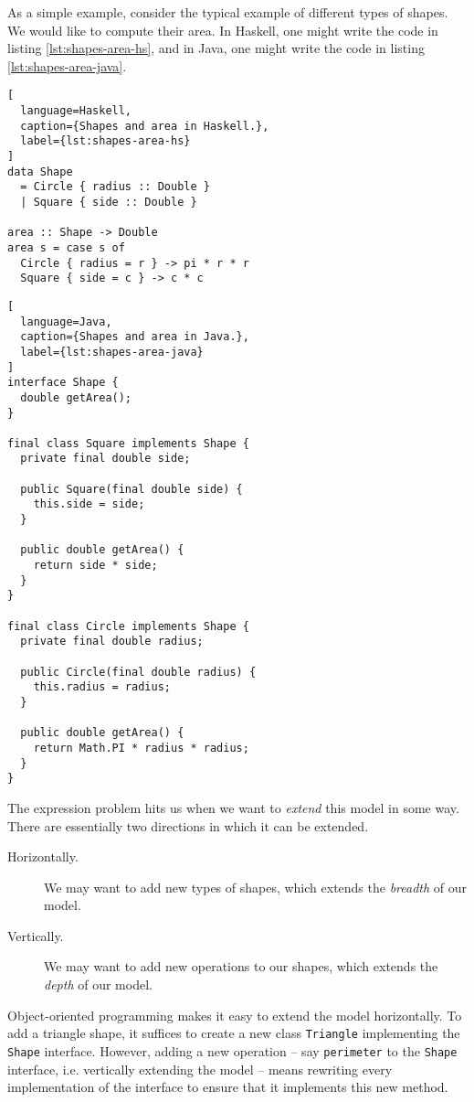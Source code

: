 \documentclass[letterpaper,11pt]{article}
\newcommand{\code}{\texttt}
\begin{document}
As a simple example, consider the typical example of different types of shapes.
We would like to compute their area. In Haskell, one might write the code in
listing \ref{lst:shapes-area-hs}, and in Java, one might write the code in
listing \ref{lst:shapes-area-java}.

\begin{lstlisting}[
  language=Haskell,
  caption={Shapes and area in Haskell.},
  label={lst:shapes-area-hs}
]
data Shape
  = Circle { radius :: Double }
  | Square { side :: Double }

area :: Shape -> Double
area s = case s of
  Circle { radius = r } -> pi * r * r
  Square { side = c } -> c * c
\end{lstlisting}

\begin{lstlisting}[
  language=Java,
  caption={Shapes and area in Java.},
  label={lst:shapes-area-java}
]
interface Shape {
  double getArea();
}

final class Square implements Shape {
  private final double side;

  public Square(final double side) {
    this.side = side;
  }

  public double getArea() {
    return side * side;
  }
}

final class Circle implements Shape {
  private final double radius;

  public Circle(final double radius) {
    this.radius = radius;
  }

  public double getArea() {
    return Math.PI * radius * radius;
  }
}
\end{lstlisting}

The expression problem hits us when we want to \emph{extend} this model in some
way. There are essentially two directions in which it can be extended.
\begin{description}
  \item[Horizontally.] We may want to add new types of shapes, which extends
    the \emph{breadth} of our model.
  \item[Vertically.] We may want to add new operations to our shapes, which
    extends the \emph{depth} of our model.
\end{description}

Object-oriented programming makes it easy to extend the model horizontally. To
add a triangle shape, it suffices to create a new class \code{Triangle}
implementing the \code{Shape} interface. However, adding a new operation --
say \texttt{perimeter} to the \code{Shape} interface, i.e. vertically
extending the model -- means rewriting every implementation of the interface to
ensure that it implements this new method.
\end{document}
